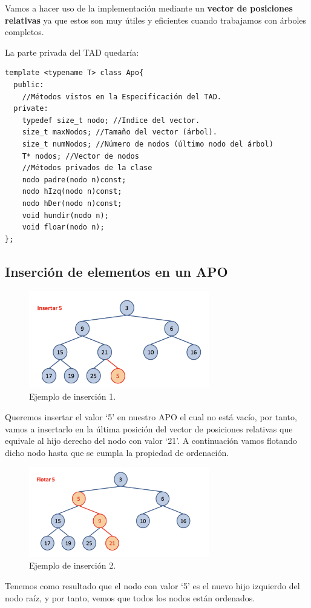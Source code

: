 Vamos a hacer uso de la implementación mediante un \textbf{vector de posiciones relativas} ya que estos son muy útiles y eficientes cuando trabajamos con árboles completos.

La parte privada del TAD quedaría:
\begin{verbatim}
template <typename T> class Apo{
  public:
    //Métodos vistos en la Especificación del TAD.
  private:
    typedef size_t nodo; //Indice del vector.
    size_t maxNodos; //Tamaño del vector (árbol).
    size_t numNodos; //Número de nodos (último nodo del árbol)
    T* nodos; //Vector de nodos
    //Métodos privados de la clase
    nodo padre(nodo n)const;
    nodo hIzq(nodo n)const;
    nodo hDer(nodo n)const;
    void hundir(nodo n);
    void floar(nodo n);
};
\end{verbatim}
\newpage
\subsection*{Inserción de elementos en un APO}
\begin{figure}[h]
  \begin{center}
    \includegraphics[width=0.7\textwidth]{assets/apo2.png}
  \end{center}
  \caption{Ejemplo de inserción 1.}
\end{figure}
Queremos insertar el valor `5' en nuestro APO el cual no está vacío, por tanto, vamos a insertarlo en la última posición del vector de posiciones relativas que equivale al hijo derecho del nodo con valor `21'. A continuación vamos flotando dicho nodo hasta que se cumpla la propiedad de ordenación.
\begin{figure}[h]
  \begin{center}
    \includegraphics[width=0.7\textwidth]{assets/apo3.png}
  \end{center}
  \caption{Ejemplo de inserción 2.}
\end{figure}
Tenemos como resultado que el nodo con valor `5' es el nuevo hijo izquierdo del nodo raíz, y por tanto, vemos que todos los nodos están ordenados.
